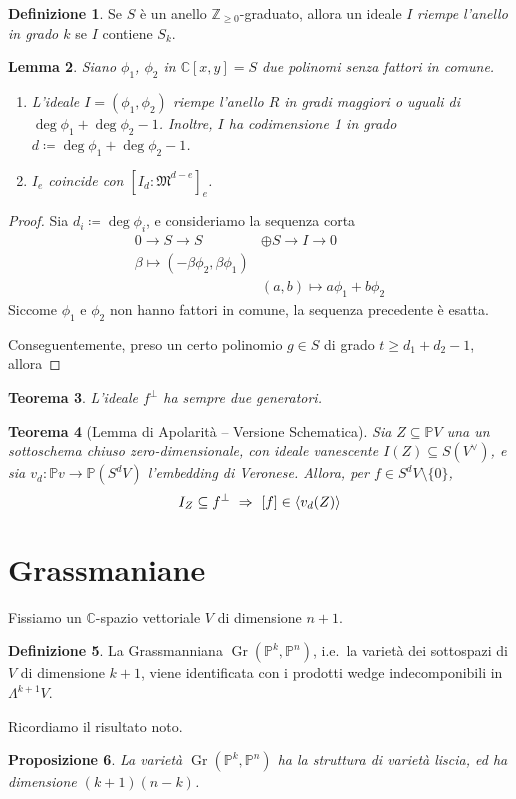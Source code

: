 \documentclass[a4paper, 11pt]{article}
\theoremstyle{definition}
\newtheorem{Def}{Definizione}[section]
\theoremstyle{plain}
\newtheorem{Lemma}[Def]{Lemma}
\newtheorem{Prop}[Def]{Proposizione}
\newtheorem{Teo}[Def]{Teorema}
\DeclarePairedDelimiter{\ang}{\langle}{\rangle}
\newcommand{\PP}{\mathbb{P}}
\newcommand{\C}{\mathbb{C}}
\newcommand{\Z}{\mathbb{Z}}
\newcommand{\MM}{\mathfrak{M}}
\newcommand{\deff}{\coloneqq}
\DeclareMathOperator{\Gr}{Gr}
\begin{document}
\begin{Def}
		Se $S$ è un anello $\Z_{\ge 0}$-graduato, allora un ideale $I$ \emph{riempe l'anello in grado $k$} se $I$ contiene $S_k$.
\end{Def}
\begin{Lemma}
	Siano $\phi_1$, $\phi_2$ in $\C[x,y] = S$ due polinomi senza fattori in comune.
	\begin{enumerate}
		\item L'ideale $I = (\phi_1, \phi_2)$ riempe l'anello $R$ in gradi maggiori o uguali di $\deg \phi_1 + \deg \phi_2 - 1$. Inoltre, $I$ ha codimensione 1 in grado $d \deff \deg \phi_1 + \deg \phi_2 -1 $.
		\item  $I_e$ coincide con $[I_d \colon \MM^{d-e}]_e$.
	\end{enumerate}
\end{Lemma}
\begin{proof}
	Sia $d_i \deff \deg \phi_i$, e consideriamo la sequenza corta
	\[
	\begin{split}
		0 \to S \to S &\oplus S \to I \to 0\\
		\beta \mapsto (-\beta\phi_2, \beta\phi_1)\\
		&(a,b) \mapsto a\phi_1 + b\phi_2
	\end{split}
	\]
	Siccome $\phi_1$ e $\phi_2$ non hanno fattori in comune, la sequenza precedente è esatta.
	
	Conseguentemente, preso un certo polinomio $g \in S$ di grado $t \ge d_1 + d_2 -1$, allora 
\end{proof}

\begin{Teo}
	L'ideale $f^\bot$ ha sempre due generatori.	
\end{Teo}
\begin{Teo}[Lemma di Apolarità -- Versione Schematica]
	Sia $Z \subseteq \PP V$ una un sottoschema chiuso zero-dimensionale, con ideale vanescente $I(Z) \subseteq S(V^\vee)$, e sia $v_d \colon \PP v \to \PP(S^dV)$ l'embedding di Veronese. Allora, per $f \in S^d V \setminus \{0\}$,
	\[
		I_Z \subseteq f^\bot\ \Rightarrow\ [f] \in \ang{v_d(Z)}
	\]
\end{Teo}
\section{Grassmaniane}
Fissiamo un $\C$-spazio vettoriale $V$ di dimensione $n+1$.
\begin{Def}
	La Grassmanniana $\Gr(\PP^k, \PP^n)$, i.e.\ la varietà dei sottospazi di $V$ di dimensione $k+1$, viene identificata con i prodotti wedge indecomponibili in $\Lambda^{k+1} V$.
\end{Def}
Ricordiamo il risultato noto.
\begin{Prop}
	La varietà $\Gr(\PP^k, \PP^n)$ ha la struttura di varietà liscia, ed ha dimensione $(k+1)(n-k)$.
\end{Prop}
\end{document}
